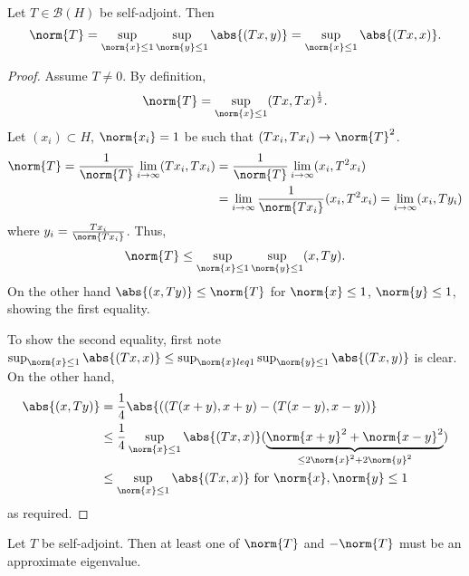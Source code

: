\documentclass{article}
\begin{document}
\begin{lemma}
    Let $T \in \mathcal{B}(H)$ be self-adjoint. Then
    \begin{equation*}
        \norm{T} = \sup_{\norm{x} \leq 1} \sup_{\norm{y} \leq 1} \abs{(Tx, y)} = \sup_{\norm{x} \leq 1} \abs{(Tx, x)}.
    \end{equation*}
\end{lemma}

\begin{proof}
    Assume $T \neq 0$. By definition,
    \begin{equation*}
        \norm{T} = \sup_{\norm{x} \leq 1} (Tx,Tx)^\frac{1}{2}.
    \end{equation*}
    Let $(x_i) \subset H$, $\norm{x_i} = 1$ be such that $(T x_i, T x_i) \to \norm{T}^2$.
    \begin{align*}
        \norm{T} = \frac{1}{\norm{T}} \lim_{i \to \infty} (T x_i, T x_i) &= \frac{1}{\norm{T}} \lim_{i \to \infty} (x_i, T^2 x_i) \\
                                                                         &= \lim_{i \to \infty} \frac{1}{\norm{T x_i}} (x_i, T^2 x_i) = \lim_{i \to \infty} (x_i, T y_i)
    \end{align*}
    where $y_i = \frac{T x_i}{\norm{T x_i}}$. Thus,
    \begin{equation*}
        \norm{T} \leq \sup_{\norm{x} \leq 1} \sup_{\norm{y} \leq 1} (x, Ty).
    \end{equation*}
    On the other hand $\abs{(x, Ty)} \leq \norm{T}$ for $\norm{x} \leq 1$, $\norm{y} \leq 1$, showing the first equality.

    To show the second equality, first note $\sup_{\norm{x} \leq 1} \abs{(Tx,x)} \leq \sup_{\norm{x} leq 1} \sup_{\norm{y} \leq 1} \abs{(Tx, y)}$ is clear. On the other hand,
    \begin{align*}
        \abs{(x, Ty)} &= \frac{1}{4} \abs{((T(x+y),x+y) - (T(x-y),x-y))} \\
        &\leq \frac{1}{4} \sup_{\norm{x} \leq 1} \abs{(Tx,x)} (\underbrace{\norm{x+y}^2 + \norm{x-y}^2}_{\leq 2 \norm{x}^2 + 2 \norm{y}^2}) \\
        &\leq \sup_{\norm{x} \leq 1} \abs{(Tx,x)} \text{ for }\norm{x}, \norm{y} \leq 1
    \end{align*}
    as required.
\end{proof}

\begin{lemma}
    Let $T$ be self-adjoint. Then at least one of $\norm{T}$ and $-\norm{T}$ must be an approximate eigenvalue.
\end{lemma}
\end{document}
